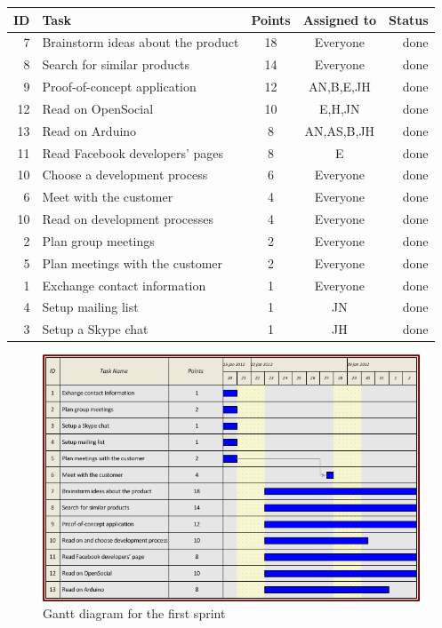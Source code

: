 \begin{table}[ht!]
\begin{tabular}{ | r | l | c | c | r | }

\hline
\textbf{ID} & \textbf{Task} & \textbf{Points} & \textbf{Assigned to} & \textbf{Status} \\
\hline

 7 & Brainstorm ideas about the product		& 18 & Everyone		& done \\
\hline
 8 & Search for similar products			& 14 & Everyone		& done \\
\hline
 9 & Proof-of-concept application			& 12 & AN,B,E,JH	& done \\
\hline
12 & Read on OpenSocial						& 10 & E,H,JN		& done \\
\hline
13 & Read on Arduino						& 8  & AN,AS,B,JH	& done \\
\hline
11 & Read Facebook developers' pages		& 8  & E			& done\\
\hline
10 & Choose a development process			& 6  & Everyone		& done \\
\hline
 6 & Meet with the customer					& 4  & Everyone		& done \\
\hline
10 & Read on development processes			& 4  & Everyone		& done \\
\hline
 2 & Plan group meetings					& 2  & Everyone		& done \\
\hline
 5 & Plan meetings with the customer		& 2  & Everyone		& done \\
\hline
 1 & Exchange contact information			& 1  & Everyone		& done \\
\hline
 4 & Setup mailing list						& 1  & JN			& done \\
\hline
 3 & Setup a Skype chat						& 1  & JH			& done \\
\hline

\end{tabular}
\end{table}

\newpage

\begin{figure}[h!]
\centering \includegraphics[scale=0.8]{img/sprints-gantt1.png}
\caption{Gantt diagram for the first sprint}
\label{fig:sprints-gantt1}
\end{figure}

